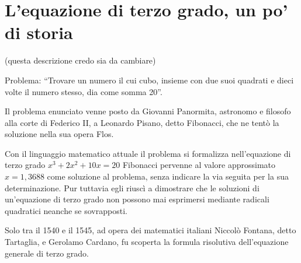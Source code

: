 % 
% 
% 
% 
% 


\section{L'equazione di terzo grado, un po' di storia}
\label{sec:eq2gr_gradosup}(questa descrizione credo sia da cambiare)

Problema: ``Trovare un numero il cui cubo, insieme con due suoi quadrati e 
dieci 
volte il numero stesso, dia come somma 20''.

Il problema enunciato venne posto da Giovanni Panormita, astronomo e filosofo 
alla corte di Federico II, a Leonardo Pisano, detto Fibonacci, che ne tentò la 
soluzione nella sua opera Flos.

Con il linguaggio matematico attuale il problema si formalizza nell'equazione 
di 
terzo grado \(x^3+2x^2+10x=20\) Fibonacci pervenne al valore approssimato 
\(x=1,3688\) come soluzione al problema, senza indicare la via seguita per la sua 
determinazione. Pur tuttavia egli riuscì a dimostrare che le soluzioni di 
un'equazione di terzo grado non possono mai esprimersi mediante radicali 
quadratici neanche se sovrapposti.

Solo tra il 1540 e il 1545, ad opera dei matematici italiani Niccolò Fontana, 
detto Tartaglia, e Gerolamo Cardano, fu scoperta la formula risolutiva 
dell'equazione generale di terzo grado.

